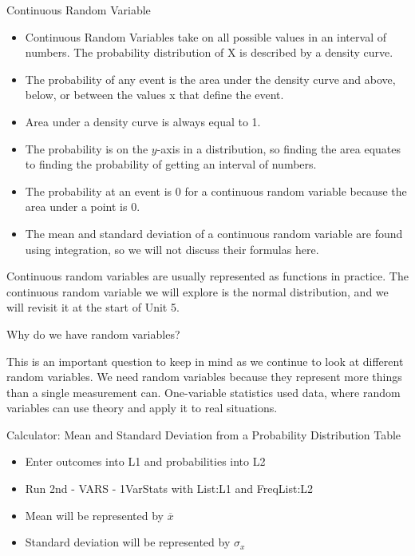 \documentclass[../stats.tex]{subfiles}
\begin{document}
Continuous Random Variable 
\begin{itemize}
    \item Continuous Random Variables take on all possible values in an interval of numbers. The probability distribution of X is described by a density curve.
    \item The probability of any event is the area under the density curve and above, below, or between the values x that define the event.
    \item Area under a density curve is always equal to 1.
    \item The probability is on the $y$-axis in a distribution, so finding the area equates to finding the probability of getting an interval of numbers.
    \item The probability at an event is 0 for a continuous random variable because the area under a point is 0.
    \item The mean and standard deviation of a continuous random variable are found using integration, so we will not discuss their formulas here.
\end{itemize}

Continuous random variables are usually represented as functions in practice. The continuous random variable we will explore is the normal distribution, and we will revisit it at the start of Unit 5.

Why do we have random variables?

This is an important question to keep in mind as we continue to look at different random variables. We need random variables because they represent more things than a single measurement can. One-variable statistics used data, where random variables can use theory and apply it to real situations.

Calculator: Mean and Standard Deviation from a Probability Distribution Table 
\begin{itemize}
    \item Enter outcomes into L1 and probabilities into L2 
    \item Run 2nd - VARS - 1VarStats with List:L1 and FreqList:L2 
    \item Mean will be represented by $\overline{x}$
    \item Standard deviation will be represented by $\sigma_x$
\end{itemize}
\pagebreak
\end{document}
